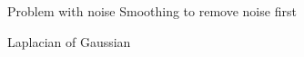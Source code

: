 \documentclass[9pt, aspectratio=169]{beamer}
\begin{document}
\begin{frame}
\begin{columns}
\begin{column}{.4\textwidth}
    \end{column}
    \end{columns}
\end{frame}

\begin{frame}
    {Problem with noise}
    Smoothing to remove noise first
\end{frame}

\begin{frame}
    {Laplacian of Gaussian}
\end{frame}
\end{document}
